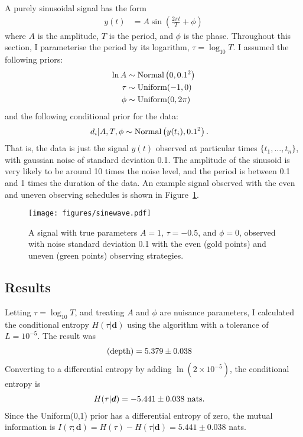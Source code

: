 \documentclass[entropy,article,accept,oneauthor,pdftex,10pt,a4paper]{mdpi}
\renewcommand{\d}{\boldsymbol{d}}
\newcommand{\depth}{(\textnormal{depth})}
\begin{document}
A purely sinusoidal signal has the form
\begin{align}
y(t) &= A \sin \left(\frac{2\pi t}{T} + \phi\right)
\end{align}
where $A$ is the amplitude, $T$ is the period, and $\phi$ is the phase.
Throughout this section, I parameterise the period by its logarithm,
$\tau = \log_{10} T$. I assumed the following priors:
\begin{align}
\ln A   &\sim \textnormal{Normal}\left(0, 0.1^2\right)  \\
\tau    &\sim \textnormal{Uniform}(-1, 0)  \\
\phi    &\sim \textnormal{Uniform}(0, 2\pi)
\end{align}
and the following conditional prior for the data:
\begin{align}
d_i | A, T, \phi &\sim \textnormal{Normal}\left(y(t_i), 0.1^2\right).
\end{align}
That is, the data is just the signal $y(t)$ observed at particular times
$\{t_1, ..., t_n\}$, with gaussian noise of standard deviation 0.1.
The amplitude of the sinusoid is very likely to be around 10 times the
noise level, and the period is between 0.1 and 1 times the duration of
the data. An example signal observed with the even and uneven observing schedules
is shown in Figure~\ref{fig:sinewave}.

\begin{figure}[!ht]
\centering
\texttt{[image: figures/sinewave.pdf]}
\caption{A signal with true parameters $A=1$, $\tau=-0.5$, and
$\phi=0$, observed with noise standard deviation 0.1 with the
even (gold points) and uneven (green points) observing strategies.
\label{fig:sinewave}}
\end{figure}


\subsection{Results}

Letting $\tau = \log_{10} T$, and treating
$A$ and $\phi$ are nuisance parameters, I calculated the conditional entropy
$H(\tau | \d)$ using the algorithm with a tolerance of $L = 10^{-5}$.
The result was
\begin{align}
\depth &= 5.379 \pm 0.038
\end{align}
Converting to a differential entropy by adding $\ln (2 \times 10^{-5})$, the conditional
entropy is
\begin{align}
H(\tau | \d) &= -5.441 \pm 0.038 \textnormal{ nats}.
\end{align}
Since the Uniform(0,1) prior has a differential entropy of zero, the
mutual information is $I(\tau; \d) = H(\tau) - H(\tau | \d) = 5.441 \pm 0.038$
nats.
\end{document}
